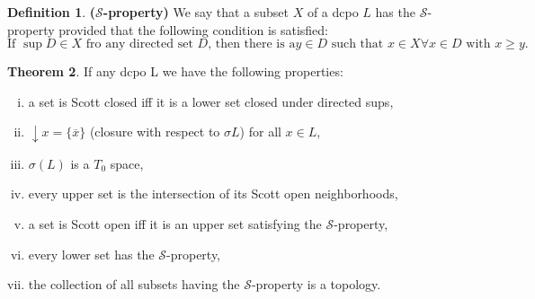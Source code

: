 \documentclass[a4paper,12pt]{article}
\theoremstyle{definition}
\newtheorem{theorem}{Theorem}[section]
\newtheorem{definition}[theorem]{Definition}
\begin{document}
\begin{definition}\textbf{($\mathcal{S}$-property)}
We say that a subset $X$ of a dcpo $L$ has the $\mathcal{S}$-property provided that the following condition is satisfied:
$$\text{If } \sup D \in X \text{ fro any directed set } D \text{, then there is a} y \in D \text{ such that } x \in X \forall x \in D \text{ with } x \geq y.$$
\end{definition}

\begin{theorem}If any dcpo L we have the following properties:
\begin{enumerate}[(i)]
    \item a set is Scott closed iff it is a lower set closed under directed sups,
    \item $\downarrow x = \{\overline{x}\}$ (closure with respect to $\sigma{L}$) for all $x \in L$,
    \item $\sigma(L)$ is a $T_0$ space,
    \item every upper set is the intersection of its Scott open neighborhoods,
    \item a set is Scott open iff it is an upper set satisfying the $\mathcal{S}$-property,
    \item every lower set has the $\mathcal{S}$-property,
    \item the collection of all subsets having the $\mathcal{S}$-property is a topology.
\end{enumerate}
\end{theorem}
\end{document}
